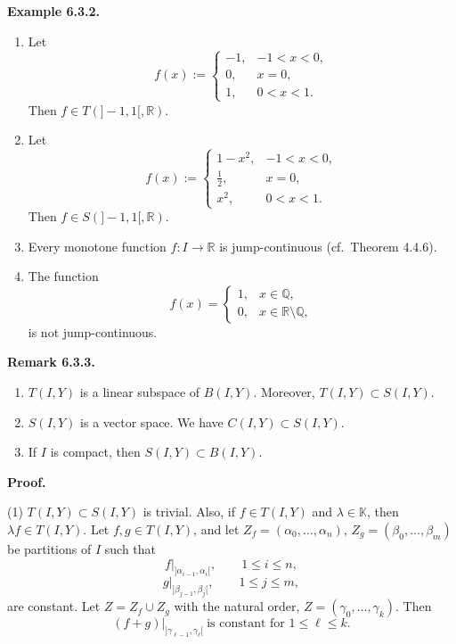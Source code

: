 \documentclass[12pt]{article}
\newenvironment{bemerkung}[1]{%
  \par\vspace{6pt}\noindent\textbf{Remark #1.}\itshape\space
}{%
  \par\vspace{6pt}
}
\begin{document}
\par\vspace{6pt}\noindent\textbf{Example 6.3.2.}\itshape\space
\begin{enumerate}
    \item Let
    \[
    f(x):=
    \begin{cases}
    -1, & -1<x<0,\\
    0,  & x=0,\\
    1,  & 0<x<1.
    \end{cases}
    \]
    Then $f\in T(]-1,1[,\mathbb R)$.

    \item Let
    \[
    f(x):=
    \begin{cases}
    1-x^2, & -1<x<0,\\
    \frac12, & x=0,\\
    x^2, & 0<x<1.
    \end{cases}
    \]
    Then $f\in S(]-1,1[,\mathbb R)$.

    \item Every monotone function $f:I\to\mathbb R$ is jump-continuous (cf.\ Theorem 4.4.6).

    \item The function
    \[
    f(x)=
    \begin{cases}
    1, & x\in\mathbb Q,\\
    0, & x\in\mathbb R\setminus\mathbb Q,
    \end{cases}
    \]
    is not jump-continuous.
\end{enumerate}

  \begin{bemerkung}{6.3.3}
  \begin{enumerate}
    \item $T(I,Y)$ is a linear subspace of $B(I,Y)$. Moreover, $T(I,Y)\subset S(I,Y)$.

    \item $S(I,Y)$ is a vector space. We have $C(I,Y)\subset S(I,Y)$.

    \item If $I$ is compact, then $S(I,Y)\subset B(I,Y)$.
  \end{enumerate}
  \end{bemerkung}

  \par\vspace{6pt}\noindent\textbf{Proof.}

  \noindent(1) $T(I,Y)\subset S(I,Y)$ is trivial. Also, if $f\in T(I,Y)$ and $\lambda\in\mathbb K$, then $\lambda f\in T(I,Y)$. Let
  \(f,g\in T(I,Y)\), and let
  \(Z_f=(\alpha_0,\ldots,\alpha_n)\),
  \(Z_g=(\beta_0,\ldots,\beta_m)\)
  be partitions of $I$ such that
  \[
  f|_{]\alpha_{i-1},\alpha_i[},\qquad 1\le i\le n,
  \]
  \[
  g|_{]\beta_{j-1},\beta_j[},\qquad 1\le j\le m,
  \]
  are constant. Let $Z=Z_f\cup Z_g$ with the natural order,
  \(Z=(\gamma_0,\ldots,\gamma_k)\). Then
  \[
  (f+g)|_{]\gamma_{\ell-1},\gamma_\ell[}\ \text{is constant for }1\le \ell\le k.
  \]
\end{document}
